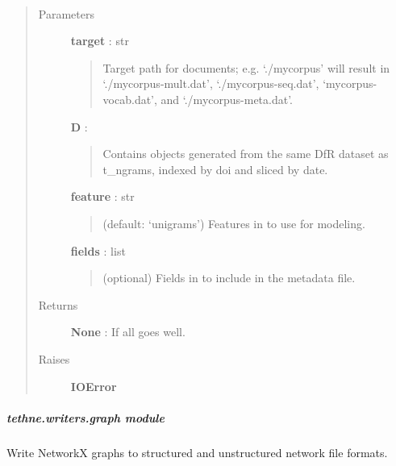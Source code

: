 \documentclass[letterpaper,10pt,english]{sphinxmanual}
\begin{document}
\begin{fulllineitems}
\label{tethne.writers.corpora:tethne.writers.corpora.to_dtm_input}~\begin{quote}\begin{description}
\item[{Parameters}] \leavevmode
\textbf{target} : str
\begin{quote}

Target path for documents; e.g. `./mycorpus' will result in 
`./mycorpus-mult.dat', `./mycorpus-seq.dat', `mycorpus-vocab.dat', and
`./mycorpus-meta.dat'.
\end{quote}

\textbf{D} : {\hyperref[tethne.classes.corpus:tethne.classes.corpus.Corpus]{}}
\begin{quote}

Contains {\hyperref[tethne.classes.paper:tethne.classes.paper.Paper]{}} objects generated from the same DfR dataset
as t\_ngrams, indexed by doi and sliced by date.
\end{quote}

\textbf{feature} : str
\begin{quote}

(default: `unigrams') Features in {\hyperref[tethne.classes.corpus:tethne.classes.corpus.Corpus]{}} to use for
modeling.
\end{quote}

\textbf{fields} : list
\begin{quote}

(optional) Fields in {\hyperref[tethne.classes.paper:tethne.classes.paper.Paper]{}} to include in the metadata file.
\end{quote}

\item[{Returns}] \leavevmode
\textbf{None} : If all goes well.

\item[{Raises}] \leavevmode
\textbf{IOError}

\end{description}\end{quote}

\end{fulllineitems}



\subparagraph{tethne.writers.graph module}
\label{tethne.writers.graph:module-tethne.writers.graph}\label{tethne.writers.graph:tethne-writers-graph-module}\label{tethne.writers.graph::doc}
Write NetworkX graphs to structured and unstructured network file formats.
\end{document}
